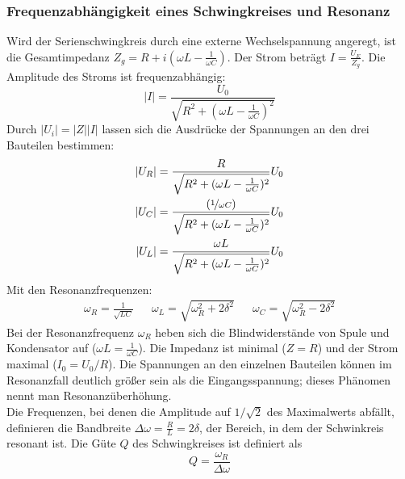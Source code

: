 \subsubsection{Frequenzabhängigkeit eines Schwingkreises und Resonanz}
\label{ssec:final_cite}
Wird der Serienschwingkreis durch eine externe Wechselspannung angeregt, ist die Gesamtimpedanz \(Z_g = R + i(\omega L - \frac{1}{\omega C})\). Der Strom beträgt \(I = \frac{U_E}{Z_g}\). Die Amplitude des Stroms ist frequenzabhängig:
\begin{equation} \label{eq:rlc_strom} |I| = \frac{U_0}{\sqrt{R^2 + (\omega L - \frac{1}{\omega C})^2}} \end{equation}
Durch \(|U_i|=|Z||I|\) lassen sich die Ausdrücke der Spannungen an den drei Bauteilen bestimmen: 
\begin{align}
    |U_R|&=\frac{R}{\sqrt{R^2+(\omega L-\frac{1}{\omega C})^2}}U_0\\
    |U_C|&=\frac{(\nicefrac{1}{\omega C})}{\sqrt{R^2+(\omega L-\frac{1}{\omega C})^2}}U_0\\
    |U_L|&=\frac{\omega L}{\sqrt{R^2+(\omega L-\frac{1}{\omega C})^2}}U_0\\
\end{align}
Mit den Resonanzfrequenzen:
\begin{align}
    \omega_R=\frac{1}{\sqrt{LC}}&&\omega_L=\sqrt{\omega_R^2+2\delta^2}&&\omega_C=\sqrt{\omega_R^2-2\delta^2}
    \label{eq:Resonanzfrequenzen}
\end{align}
Bei der Resonanzfrequenz \(\omega_R\) heben sich die Blindwiderstände von Spule und Kondensator auf (\(\omega L = \frac{1}{\omega C}\)). Die Impedanz ist minimal (\(Z=R\)) und der Strom maximal (\(I_0 = U_0/R\)). Die Spannungen an den einzelnen Bauteilen können im Resonanzfall deutlich größer sein als die Eingangsspannung; dieses Phänomen nennt man Resonanzüberhöhung.\\
Die Frequenzen, bei denen die Amplitude auf \(1/\sqrt{2}\) des Maximalwerts abfällt, definieren die Bandbreite \(\Delta \omega = \frac{R}{L} = 2\delta\), der Bereich, in dem der Schwinkreis resonant ist. Die Güte \(Q\) des Schwingkreises ist definiert als
\begin{equation} 
    Q = \frac{\omega_R}{\Delta \omega}
    \label{eq:guete_def}
\end{equation}

